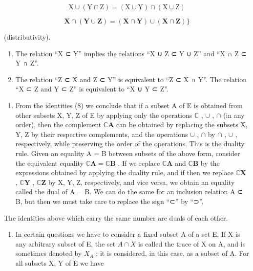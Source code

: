 \[
\mathrm{X} \cup (\mathrm{Y} \cap \mathrm{Z}) = (\mathrm{X} \cup \mathrm{Y}) \cap (\mathrm{X} \cup \mathrm{Z})
\]

\[
\mathbf {X} \cap (\mathbf {Y} \cup \mathbf {Z}) = (\mathbf {X} \cap \mathbf {Y}) \cup (\mathbf {X} \cap \mathbf {Z}) \Big \}
\]

(distributivity).

\begin{enumerate}
\def\labelenumi{(\alph{enumi})}
\setcounter{enumi}{7}
\item
  The relation ``X ⊂ Y'' implies the relations ``X ∪ Z ⊂ Y ∪ Z'' and ``X ∩ Z ⊂ Y ∩ Z''.
\item
  The relation ``Z ⊂ X and Z ⊂ Y'' is equivalent to ``Z ⊂ X ∩ Y''. The relation ``X ⊂ Z and Y ⊂ Z'' is equivalent to ``X ∪ Y ⊂ Z''.
\end{enumerate}

\begin{enumerate}
\def\labelenumi{\arabic{enumi}.}
\setcounter{enumi}{14}
\tightlist
\item
  From the identities (8) we conclude that if a subset A of E is obtained from other subsets X, Y, Z of E by applying only the operations \(\mathbb{C}\) , \(\cup\) , \(\cap\) (in any order), then the complement \(\mathbb{C}\mathbf{A}\) can be obtained by replacing the subsets X, Y, Z by their respective complements, and the operations \(\cup\) , \(\cap\) by \(\cap\) , \(\cup\) , respectively, while preserving the order of the operations. This is the duality rule. Given an equality A = B between subsets of the above form, consider the equivalent equality \(\mathbb{C}\mathbf{A} = \mathbb{C}\mathbf{B}\) . If we replace \(\mathbb{C}\mathbf{A}\) and \(\mathbb{C}\mathbf{B}\) by the expressions obtained by applying the duality rule, and if then we replace \(\mathbb{C}\mathbf{X}\) , \(\mathbb{C}\mathbf{Y}\) , \(\mathbb{C}\mathbf{Z}\) by X, Y, Z, respectively, and vice versa, we obtain an equality called the dual of A = B. We can do the same for an inclusion relation A ⊂ B, but then we must take care to replace the sign ``⊂'' by ``⊃''.
\end{enumerate}

The identities above which carry the same number are duals of each other.

\begin{enumerate}
\def\labelenumi{\arabic{enumi}.}
\setcounter{enumi}{15}
\tightlist
\item
  In certain questions we have to consider a fixed subset A of a set E. If X is any arbitrary subset of E, the set \(A \cap X\) is called the trace of X on A, and is sometimes denoted by \(X_{A}\) ; it is considered, in this case, as a subset of A. For all subsets X, Y of E we have
\end{enumerate}

